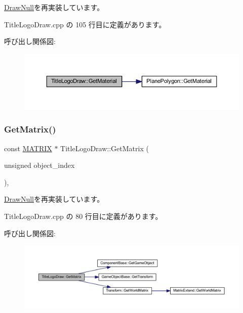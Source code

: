 \mbox{\hyperlink{class_draw_null_a84969d22d3436986f214e9896fe44fc6}{Draw\+Null}}を再実装しています。



 Title\+Logo\+Draw.\+cpp の 105 行目に定義があります。

呼び出し関係図\+:\nopagebreak
\begin{figure}[H]
\begin{center}
\leavevmode
\includegraphics[width=350pt]{class_title_logo_draw_a8858aa1b1eb9a6d4cb4605519efb20eb_cgraph}
\end{center}
\end{figure}
\mbox{\label{class_title_logo_draw_af21cd1dbd79c741a2e3ca2b8e26c5f61}} 
\subsubsection{\texorpdfstring{Get\+Matrix()}{GetMatrix()}}
{\footnotesize\ttfamily const \mbox{\hyperlink{_vector3_d_8h_a032295cd9fb1b711757c90667278e744}{M\+A\+T\+R\+IX}} $\ast$ Title\+Logo\+Draw\+::\+Get\+Matrix (\begin{DoxyParamCaption}\item[{unsigned}]{object\+\_\+index }\end{DoxyParamCaption})\hspace{0.3cm}{\ttfamily [override]}, {\ttfamily [virtual]}}



\mbox{\hyperlink{class_draw_null_adede079e9c11a756090740b20bb43022}{Draw\+Null}}を再実装しています。



 Title\+Logo\+Draw.\+cpp の 80 行目に定義があります。

呼び出し関係図\+:\nopagebreak
\begin{figure}[H]
\begin{center}
\leavevmode
\includegraphics[width=350pt]{class_title_logo_draw_af21cd1dbd79c741a2e3ca2b8e26c5f61_cgraph}
\end{center}
\end{figure}
\mbox{\label{class_title_logo_draw_a14212f1ee003c40d63db3822a84af7fb}} 
